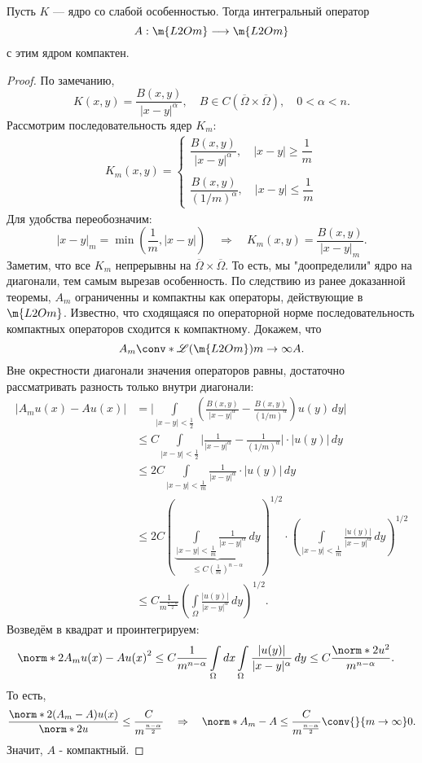 \begin{theorem} Пусть $K$ --- ядро со слабой особенностью. Тогда интегральный оператор
$$ A : \m{L2Om} \longrightarrow \m{L2Om}$$
с этим ядром компактен.
\end{theorem}
\begin{proof} По замечанию,
$$ K(x,y) = \frac{B(x,y)} {|x-y|^\alpha}, \quad B \in C(\overline{\Omega} \times \overline{\Omega}), \quad 0 < \alpha < n.$$
Рассмотрим последовательность ядер $K_m$:
\begin{gather*}
K_m(x,y) =
	\begin{cases*}
		\dfrac {B(x,y)} {|x-y|^\alpha}, \quad |x-y| \geq \dfrac {1} {m} \\
		\\
		\dfrac {B(x,y)} {(1/m)^\alpha}, \quad |x-y| \leq \dfrac {1} {m}
	\end{cases*}
\end{gather*}
Для удобства переобозначим:
$$|x-y|_m = \min \left( \frac {1} {m} , |x-y| \right) \quad \Rightarrow \quad K_m(x,y) = \frac {B(x,y)} {|x-y|_m}.$$
Заметим, что все $K_m$ непрерывны на $\overline{\Omega} \times \overline{\Omega}$. То есть, мы "доопределили" ядро на диагонали, тем самым вырезав особенность. По следствию из ранее доказанной теоремы, $A_m$ ограниченны и компактны как операторы, действующие в $\m{L2Om}$. Известно, что сходящаяся по операторной норме последовательность компактных операторов сходится к компактному. Докажем, что
$$ A_m \conv*{\mathscr{L} (\m{L2Om})}{m\to \infty} A.$$
Вне окрестности диагонали значения операторов равны, достаточно рассматривать разность только внутри диагонали:
\begin{align*}
| A_m u(x) - Au(x)| &= \Bigg\rvert \int \limits_{|x-y| < \frac {1} {2}} \left( \frac {B(x,y)} {|x-y|^\alpha} - \frac {B(x,y)} {(1/m)^\alpha} \right) u(y) \, dy \Biggl\lvert \\
&\leq C \int \limits_{|x-y| < \frac {1} {2}} \Bigg\lvert \frac {1} {|x-y|^\alpha} - \frac {1} {(1/m)^\alpha} \Bigg\rvert \cdot |u(y)| \, dy \\
&\leq 2 C \int \limits_{|x-y| < \frac {1} {m}} \frac {1} {|x-y|^\alpha} \cdot |u(y)| \, dy \\
&\leq 2 C \left( \underbrace {\int \limits_{|x-y| < \frac {1} {m}} \frac {1} {|x-y|^\alpha} \, dy}_{\leq C \left( \frac {1} {m} \right)^{n-\alpha}} \right)^{1/2} \cdot \left( \int \limits_{|x-y| < \frac {1} {m}} \frac {|u(y)|} {|x-y|^\alpha} \, dy \right)^{1/2} \\
&\leq C \frac {1} {m^{\frac {n-\alpha} {2}}} \left( \int \limits_\Omega \frac {|u(y)|} {|x-y|^\alpha} \, dy \right)^{1/2}.
\end{align*}
Возведём в квадрат и проинтегрируем:
\begin{align*}
\norm*{2}{A_m u(x) - Au(x)}^2 &\leq C \frac {1} {m^{n-\alpha}} \int \limits_\Omega dx \int \limits_\Omega \frac {|u(y)|} {|x-y|^\alpha} \, dy \leq C \frac {\norm*{2}{u}^2} {m^{n-\alpha}}.
\end{align*}
То есть,
$$ \frac {\norm*{2} {(A_m - A)u(x)}} {\norm*{2}{u}} \leq \frac {C} {m^{\frac {n-\alpha} {2}}} \quad \Rightarrow \quad \norm*{}{A_m - A} \leq \frac {C} {m^{\frac{n-\alpha} {2}}} \conv{}{m \to \infty} 0.$$
Значит, $A$ - компактный.


\end{proof}
